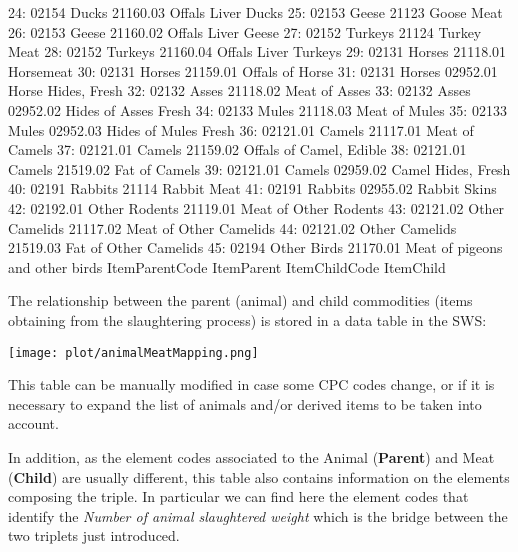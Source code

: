 \documentclass[nojss]{jss}
\begin{document}
\begin{Schunk}
\begin{Soutput}
24:          02154          Ducks      21160.03              Offals Liver Ducks
25:          02153          Geese         21123                      Goose Meat
26:          02153          Geese      21160.02              Offals Liver Geese
27:          02152        Turkeys         21124                     Turkey Meat
28:          02152        Turkeys      21160.04            Offals Liver Turkeys
29:          02131         Horses      21118.01                       Horsemeat
30:          02131         Horses      21159.01                 Offals of Horse
31:          02131         Horses      02952.01              Horse Hides, Fresh
32:          02132          Asses      21118.02                   Meat of Asses
33:          02132          Asses      02952.02            Hides of Asses Fresh
34:          02133          Mules      21118.03                   Meat of Mules
35:          02133          Mules      02952.03            Hides of Mules Fresh
36:       02121.01         Camels      21117.01                  Meat of Camels
37:       02121.01         Camels      21159.02         Offals of Camel, Edible
38:       02121.01         Camels      21519.02                   Fat of Camels
39:       02121.01         Camels      02959.02              Camel Hides, Fresh
40:          02191        Rabbits         21114                     Rabbit Meat
41:          02191        Rabbits      02955.02                    Rabbit Skins
42:       02192.01  Other Rodents      21119.01           Meat of Other Rodents
43:       02121.02 Other Camelids      21117.02          Meat of Other Camelids
44:       02121.02 Other Camelids      21519.03           Fat of Other Camelids
45:          02194    Other Birds      21170.01 Meat of pigeons and other birds
    ItemParentCode     ItemParent ItemChildCode                       ItemChild
\end{Soutput}
\end{Schunk}
The relationship between the parent (animal) and child commodities (items obtaining from the slaughtering process) is stored in a data table in the SWS:

\begin{center}
\texttt{[image: plot/animalMeatMapping.png]}
\end{center}

This table can be manually modified in case some CPC codes change, or if it is necessary to expand the list
 of animals and/or derived items to be taken into account.


In addition, as the element codes associated to the Animal (\textbf{Parent}) and Meat (\textbf{Child}) 
are usually different, this table also contains information on the elements composing the triple. In particular 
we can find here the element codes that identify the \textit{Number of animal slaughtered weight} which is the 
bridge between the two triplets just introduced.
\end{document}
